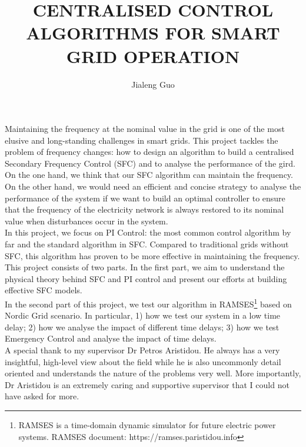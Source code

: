 \documentclass{report}
\begin{document}
\title{CENTRALISED CONTROL ALGORITHMS FOR SMART GRID OPERATION}
\author{Jialeng Guo}

\beforepreface
{}
Maintaining the frequency at the nominal value in the grid is one of the most elusive and long-standing challenges in smart grids. This project tackles the problem of frequency changes: how to design an algorithm to build a centralised Secondary Frequency Control (SFC) and to analyse the performance of the gird. On the one hand, we think that our SFC algorithm can maintain the frequency. On the other hand, we would need an efficient and concise strategy to analyse the performance of the system if we want to build an optimal controller to ensure that the frequency of the electricity network is always restored to its nominal value when disturbances occur in the system.\\

In this project, we focus on PI Control: the most common control algorithm by far and the standard algorithm in SFC. Compared to traditional grids without SFC, this algorithm has proven to be more effective in maintaining the frequency.\\

This project consists of two parts. In the first part, we aim to understand the physical theory behind SFC and PI control and present our efforts at building effective SFC models.\\

In the second part of this project, we test our algorithm in RAMSES\textcolor{red}{\footnote{RAMSES is a time-domain dynamic simulator for future electric power systems. RAMSES document: https://ramses.paristidou.info}} based on Nordic Grid scenario. In particular, 1) how we test our system in a low time delay; 2) how we analyse the impact of different time delays; 3) how we test Emergency Control and analyse the impact of time delays.\\

A special thank to my supervisor Dr Petros Aristidou. He always has a very insightful, high-level view about the field while he is also uncommonly detail oriented and understands the nature of the problems very well. More importantly, Dr Aristidou is an extremely caring and supportive supervisor that I could not have asked for more.\\
\end{document}
